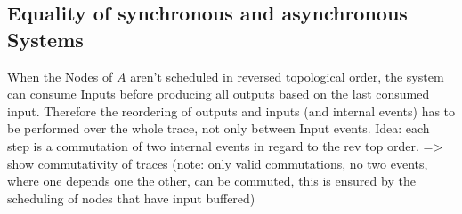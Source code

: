 




\subsection{Equality of synchronous and asynchronous Systems}
\label{sec:concepts:equalitys_without_timing:sync_async}

When the Nodes of \(A\) aren't scheduled in reversed topological order, the system can consume Inputs before producing all outputs
based on the last consumed input.
Therefore the reordering of outputs and inputs (and internal events) has to be performed over the whole trace, not only between Input events.
Idea: each step is a commutation of two internal events in regard to the rev top order.
=> show commutativity of traces (note: only valid commutations, no two events, where one depends one the other, can be commuted, this is ensured by the scheduling of nodes that have input buffered)
